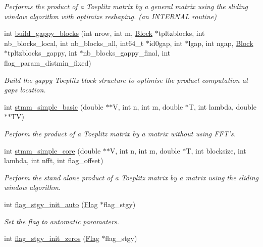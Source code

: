 \begin{DoxyCompactItemize}
\begin{DoxyCompactList}\small\item\em Performs the product of a Toeplitz matrix by a general matrix using the sliding window algorithm with optimize reshaping. (an I\-N\-T\-E\-R\-N\-A\-L routine) \end{DoxyCompactList}\item 
int \hyperlink{group__group21_gaf6b3f49e179ac9ed28354ddd7dbb6a04}{build\-\_\-gappy\-\_\-blocks} (int nrow, int m, \hyperlink{structBlock}{Block} $\ast$tpltzblocks, int nb\-\_\-blocks\-\_\-local, int nb\-\_\-blocks\-\_\-all, int64\-\_\-t $\ast$id0gap, int $\ast$lgap, int ngap, \hyperlink{structBlock}{Block} $\ast$tpltzblocks\-\_\-gappy, int $\ast$nb\-\_\-blocks\-\_\-gappy\-\_\-final, int flag\-\_\-param\-\_\-distmin\-\_\-fixed)
\begin{DoxyCompactList}\small\item\em Build the gappy Toeplitz block structure to optimise the product computation at gaps location. \end{DoxyCompactList}\item 
int \hyperlink{group__group21_gaf19f51ef406bebdb5e9400b6f9962077}{stmm\-\_\-simple\-\_\-basic} (double $\ast$$\ast$V, int n, int m, double $\ast$T, int lambda, double $\ast$$\ast$T\-V)
\begin{DoxyCompactList}\small\item\em Perform the product of a Toeplitz matrix by a matrix without using F\-F\-T's. \end{DoxyCompactList}\item 
int \hyperlink{group__group21_ga516de87d3daf22f1a29ba390d5e57caa}{stmm\-\_\-simple\-\_\-core} (double $\ast$$\ast$V, int n, int m, double $\ast$T, int blocksize, int lambda, int nfft, int flag\-\_\-offset)
\begin{DoxyCompactList}\small\item\em Perform the stand alone product of a Toeplitz matrix by a matrix using the sliding window algorithm. \end{DoxyCompactList}\item 
int \hyperlink{group__group21_ga234bcc963a99bea09ed92b36c711c3ec}{flag\-\_\-stgy\-\_\-init\-\_\-auto} (\hyperlink{structFlag}{Flag} $\ast$flag\-\_\-stgy)
\begin{DoxyCompactList}\small\item\em Set the flag to automatic paramaters. \end{DoxyCompactList}\item 
int \hyperlink{group__group21_ga6de858af090da4b96df6a195015ce09e}{flag\-\_\-stgy\-\_\-init\-\_\-zeros} (\hyperlink{structFlag}{Flag} $\ast$flag\-\_\-stgy)
$$
\end{DoxyCompactItemize}
